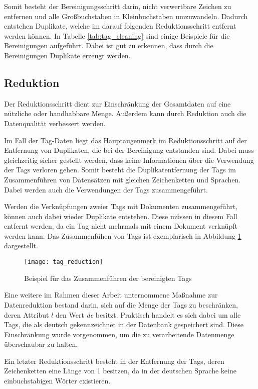 Somit besteht der Bereinigungsschritt darin, nicht verwertbare Zeichen zu entfernen und alle Großbuchstaben in Kleinbuchstaben umzuwandeln. Dadurch entstehen Duplikate, welche im darauf folgenden Reduktionsschritt entfernt werden können. In Tabelle \ref{tab:tag_cleaning} sind einige Beispiele für die Bereinigungen aufgeführt. Dabei ist gut zu erkennen, dass durch die Bereinigungen Duplikate erzeugt werden.

\subsection{Reduktion}

Der Reduktionsschritt dient zur Einschränkung der Gesamtdaten auf eine nützliche oder handhabbare Menge. Außerdem kann durch Reduktion auch die Datenqualität verbessert werden.

Im Fall der Tag-Daten liegt das Hauptaugenmerk im Reduktionsschritt auf der Entfernung von Duplikaten, die bei der Bereinigung entstanden sind. Dabei muss gleichzeitig sicher gestellt werden, dass keine Informationen über die Verwendung der Tags verloren gehen. Somit besteht die Duplikatentfernung der Tags im Zusammenführen von Datensätzen mit gleichen Zeichenketten und Sprachen. Dabei werden auch die Verwendungen der Tags zusammengeführt.

Werden die Verknüpfungen zweier Tags mit Dokumenten zusammengeführt, können auch dabei wieder Duplikate entstehen. Diese müssen in diesem Fall entfernt werden, da ein Tag nicht mehrmals mit einem Dokument verknüpft werden kann. Das Zusammenfühen von Tags ist exemplarisch in Abbildung \ref{fig:tag_reduction} dargestellt.

\begin{figure}
\centering
\texttt{[image: tag\_reduction]}
\caption{Beispiel für das Zusammenführen der bereinigten Tags}
\label{fig:tag_reduction}
\end{figure}

Eine weitere im Rahmen dieser Arbeit unternommene Maßnahme zur Datenreduktion bestand darin, sich auf die Menge der Tags zu beschränken, deren Attribut \(l\) den Wert \emph{de} besitzt. Praktisch handelt es sich dabei um alle Tags, die als deutsch gekennzeichnet in der Datenbank gespeichert sind. Diese Einschränkung wurde vorgenommen, um die zu verarbeitende Datenmenge überschaubar zu halten.

Ein letzter Reduktionsschritt besteht in der Entfernung der Tags, deren Zeichenketten eine Länge von \num{1} besitzen, da in der deutschen Sprache keine einbuchstabigen Wörter existieren.

